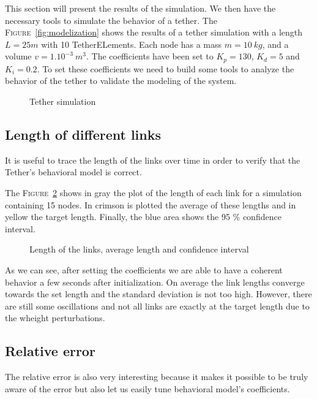 This section will present the results of the simulation. We then have the necessary tools to simulate the behavior of a tether. The \textsc{Figure}~\ref{fig:modelization} shows the results of a tether simulation with a length $L = 25m$ with 10 TetherELements. Each node has a mass $m=10\ kg$, and a volume $v=1.10^{-3}\ m^3$. The coefficients have been set to $K_p=130$, $K_d=5$ and $K_i=0.2$. To set these coefficients we need to build some tools to analyze the behavior of the tether to validate the modeling of the system.

\begin{figure}[!htb]
    \centering
    \resizebox{0.5\textwidth}{!}{}
    \caption{Tether simulation}
    \label{fig:simulation}
\end{figure}


\subsection{Length of different links}

It is useful to trace the length of the links over time in order to verify that the Tether's behavioral model is correct.

The \textsc{Figure}~\ref{fig:length} shows in gray the plot of the length of each link for a simulation containing 15 nodes. In crimson is plotted the average of these lengths and in yellow the target length. Finally, the blue area shows the 95 \% confidence interval.

\begin{figure}[!htb]
    \centering
    
    \caption{Length of the links, average length and confidence interval}
    \label{fig:length}
\end{figure}

As we can see, after setting the coefficients we are able to have a coherent behavior a few seconds after initialization. On average the link lengths converge towards the set length and the standard deviation is not too high. However, there are still some oscillations and not all links are exactly at the target length due to the wheight perturbations.

\subsection{Relative error}
The relative error is also very interesting because it makes it possible to be truly aware of the error but also let us easily tune behavioral model's coefficients.


